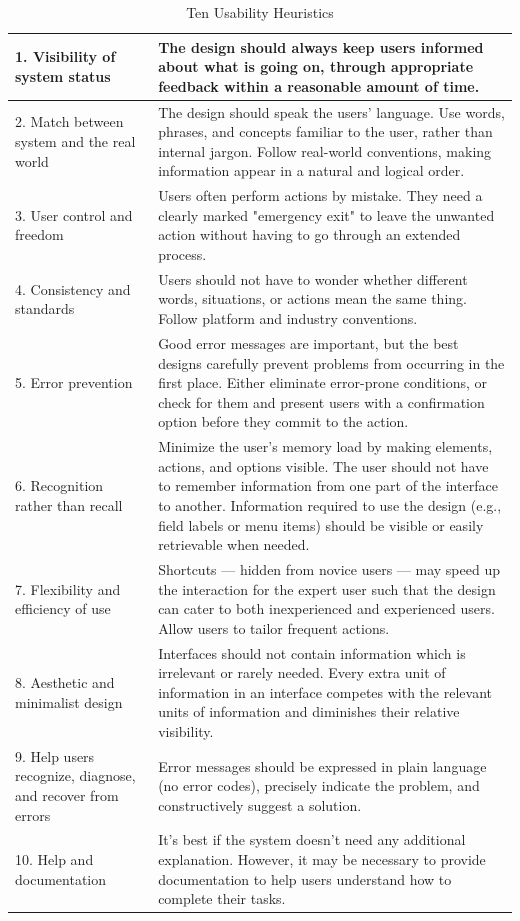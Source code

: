 {\footnotesize
\begin{table}
    \caption{Ten Usability Heuristics}
    \vspace{5mm}
    \begin{tabular}{ |p{4cm}|p{10.1cm}| }
        \hline
        1. Visibility of system status&The design should always keep users informed about what is going on, through appropriate feedback within a reasonable amount of time.\\
        \hline
        2. Match between system and the real world&The design should speak the users' language. Use words, phrases, and concepts familiar to the user, rather than internal jargon. Follow real-world conventions, making information appear in a natural and logical order.\\
        \hline
        3. User control and freedom&Users often perform actions by mistake. They need a clearly marked "emergency exit" to leave the unwanted action without having to go through an extended process.\\
        \hline
        4. Consistency and standards&Users should not have to wonder whether different words, situations, or actions mean the same thing. Follow platform and industry conventions.\\
        \hline
        5. Error prevention&Good error messages are important, but the best designs carefully prevent problems from occurring in the first place. Either eliminate error-prone conditions, or check for them and present users with a confirmation option before they commit to the action.\\
        \hline
        6. Recognition rather than recall&Minimize the user's memory load by making elements, actions, and options visible. The user should not have to remember information from one part of the interface to another. Information required to use the design (e.g., field labels or menu items) should be visible or easily retrievable when needed.\\
        \hline
        7. Flexibility and efficiency of use&Shortcuts — hidden from novice users — may speed up the interaction for the expert user such that the design can cater to both inexperienced and experienced users. Allow users to tailor frequent actions.\\
        \hline
        8. Aesthetic and minimalist design&Interfaces should not contain information which is irrelevant or rarely needed. Every extra unit of information in an interface competes with the relevant units of information and diminishes their relative visibility.\\
        \hline
        9. Help users recognize, diagnose, and recover from errors&Error messages should be expressed in plain language (no error codes), precisely indicate the problem, and constructively suggest a solution.\\
        \hline
        10. Help and documentation&It’s best if the system doesn’t need any additional explanation. However, it may be necessary to provide documentation to help users understand how to complete their tasks.\\
        \hline
    \end{tabular}
    \cite{heuristics}
\end{table}
}\\
